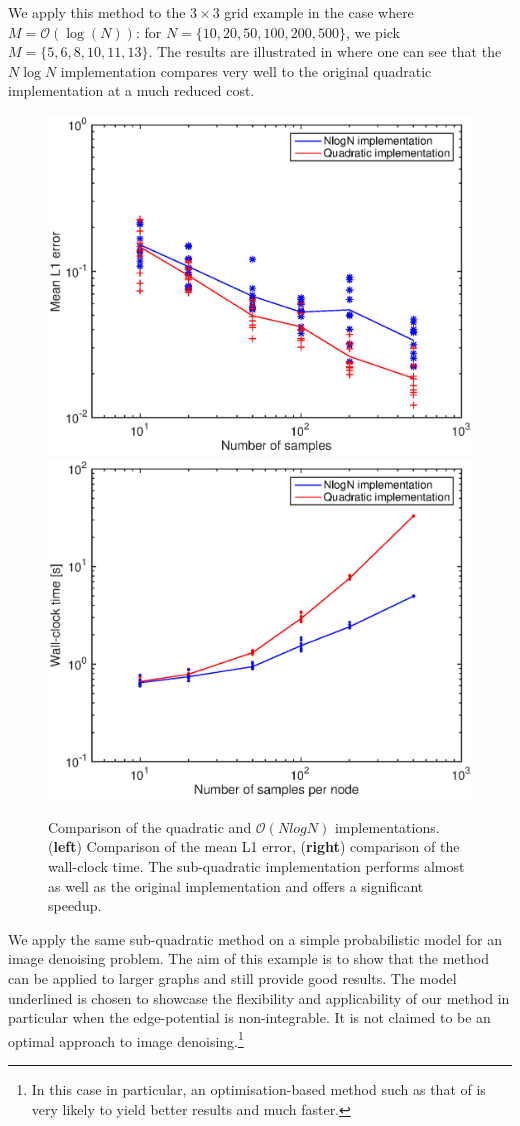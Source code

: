 We apply this method to the $3\times 3$ grid example in the case where $M=\mathcal O(\log(N))$: for $N=\{10,20,50,100,200,500\}$, we pick $M=\{5, 6,8,10,11,13\}$. The results are illustrated in  where one can see that the $N\log N$ implementation compares very well to the original quadratic implementation at a much reduced cost. 


\begin{figure}[!h]
\center
\includegraphics[width=.51\textwidth]{figures/epbp/errCompNLOGN}
\hspace*{-.7cm}
\includegraphics[width=.51\textwidth]{figures/epbp/timeCompNLOGN}
\caption{\label{figCompNLOGN}Comparison of the quadratic and $\mathcal O(N log N )$ implementations. (\textbf{left}) Comparison of the mean L1 error, (\textbf{right}) comparison of the wall-clock time. The sub-quadratic implementation performs almost as well as the original implementation and offers a significant speedup.}
\end{figure}


We apply the same sub-quadratic method on a simple probabilistic model for an image denoising problem. The aim of this example is to show that the method can be applied to larger graphs and still provide good results. The model underlined is chosen to showcase the flexibility and applicability of our method in particular when the edge-potential is non-integrable. It is not claimed to be an optimal approach to image denoising.\footnote{In this case in particular, an optimisation-based method such as that of \citet{rudin92} is very likely to yield better results and much faster.}

